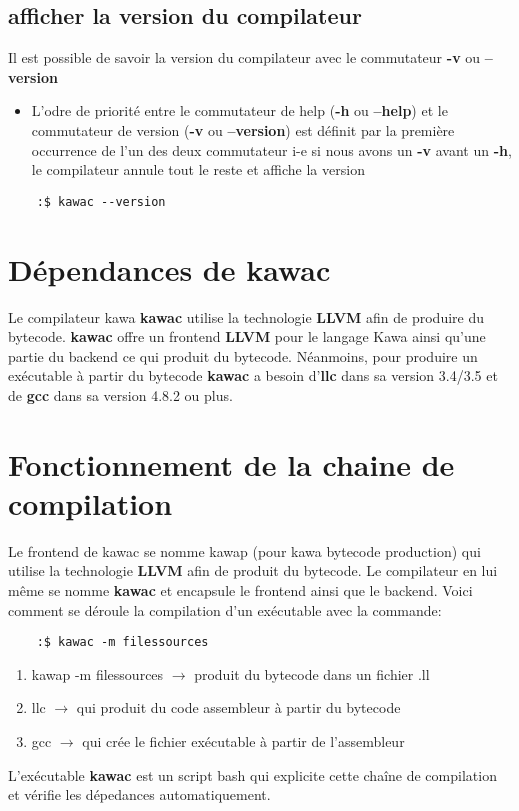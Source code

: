 \documentclass{../res/univ-projet}
\begin{document}
  \subsection{afficher la version du compilateur}
    Il est possible de savoir la version du compilateur avec le commutateur \textbf{-v} ou \textbf{--version}
    \begin{itemize}
      \item L’odre de priorité entre le commutateur de help (\textbf{-h} ou \textbf{--help}) et le commutateur de version (\textbf{-v} ou \textbf{--version}) est définit par la première occurrence de l’un des deux commutateur i-e si nous avons un \textbf{-v}
      avant un \textbf{-h}, le compilateur annule tout le reste et affiche la version
  \end{itemize}
  \begin{verbatim}
    :$ kawac --version
  \end{verbatim}

 \section{Dépendances de kawac}
  Le compilateur kawa \textbf{kawac} utilise la technologie \textbf{LLVM} afin de produire du bytecode. \textbf{kawac} offre un frontend \textbf{LLVM} pour le langage Kawa ainsi qu'une partie du backend ce qui produit du bytecode. Néanmoins, pour produire un exécutable à partir du bytecode \textbf{kawac} a besoin d'\textbf{llc} dans sa version 3.4/3.5 et de \textbf{gcc} dans sa version 4.8.2 ou plus.

 \section{Fonctionnement de la chaine de compilation}
  Le frontend de kawac se nomme kawap (pour kawa bytecode production) qui utilise la technologie \textbf{LLVM} afin de produit du bytecode. Le compilateur en lui même se nomme \textbf{kawac} et encapsule le frontend ainsi que le backend. Voici comment se déroule la compilation d'un exécutable avec la commande:\\
  \begin{verbatim}
    :$ kawac -m filessources
  \end{verbatim}

  \begin{enumerate}
    \item kawap -m filessources $\rightarrow$ produit du bytecode dans un fichier .ll
    \item llc $\rightarrow$ qui produit du code assembleur à partir du bytecode
    \item gcc $\rightarrow$ qui crée le fichier exécutable à partir de l'assembleur
  \end{enumerate}

  L'exécutable \textbf{kawac} est un script bash qui explicite cette chaîne de compilation et vérifie les dépedances automatiquement.
\end{document}

